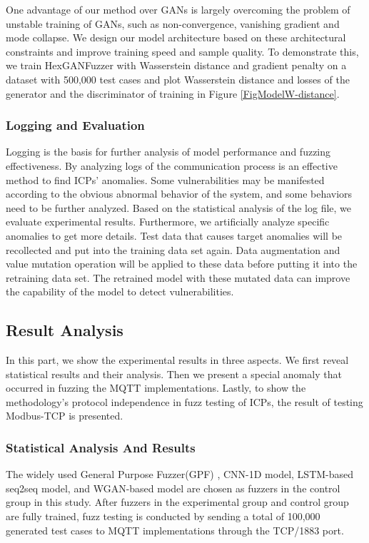 One advantage of our method over GANs is largely overcoming the problem of unstable training of GANs, such as non-convergence, vanishing gradient and mode collapse. We design our model architecture based on these architectural constraints and improve training speed and sample quality. To demonstrate this, we train HexGANFuzzer with Wasserstein distance and gradient penalty on a dataset with 500,000 test cases and plot Wasserstein distance and losses of the generator and the discriminator of training in Figure \ref{FigModelW-distance}.



\subsubsection{Logging and Evaluation}
Logging is the basis for further analysis of model performance and fuzzing effectiveness. By analyzing logs of the communication process is an effective method to find ICPs’ anomalies. Some vulnerabilities may be manifested according to the obvious abnormal behavior of the system, and some behaviors need to be further analyzed. Based on the statistical analysis of the log file, we evaluate experimental results. Furthermore, we artificially analyze specific anomalies to get more details. Test data that causes target anomalies will be recollected and put into the training data set again. Data augmentation and value mutation operation will be applied to these data before putting it into the retraining data set. The retrained model with these mutated data can improve the capability of the model to detect vulnerabilities.

\subsection{Result Analysis}
In this part, we show the experimental results in three aspects. We first reveal statistical results and their analysis. Then we present a special anomaly that occurred in fuzzing the MQTT implementations. Lastly, to show the methodology’s protocol independence in fuzz testing of ICPs, the result of testing Modbus-TCP is presented.

\subsubsection{Statistical Analysis And Results}
The widely used General Purpose Fuzzer(GPF) \cite{demott2007revolutionizing}, CNN-1D model, LSTM-based seq2seq model, and WGAN-based model are chosen as fuzzers in the control group in this study. After fuzzers in the experimental group and control group are fully trained, fuzz testing is conducted by sending a total of 100,000 generated test cases to MQTT implementations through the TCP/1883 port.

